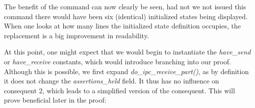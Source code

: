 The benefit of the  command can now clearly be seen, had not we not issued this command there would have been six (identical) initialized states being displayed. When one looks at how many lines the initialized state definition occupies, the replacement is a big improvement in readability.\newpage

At this point, one might expect that we would begin to instantiate the \emph{have\_send} or \emph{have\_receive} constants, which would introduce branching into our proof. Although this is possible, we first expand \emph{do\_ipc\_receive\_part()}, as by definition it does not change the \emph{assertions\_held} field. It thus has no influence on consequent 2, which leads to a simplified version of the consequent. This will prove beneficial later in the proof:\vspace{2mm}

